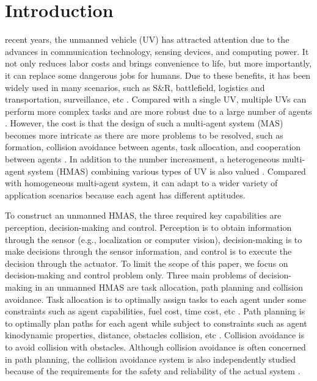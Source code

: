\documentclass{ieeeaccess}
\begin{document}
\section{Introduction}
 recent years, the unmanned vehicle (UV) has attracted attention due to the advances in communication technology, sensing devices, and computing power. It not only reduces labor costs and brings convenience to life, but more importantly, it can replace some dangerous jobs for humans. Due to these benefits, it has been widely used in many scenarios, such as S\&R, battlefield, logistics and transportation, surveillance, etc \cite{9700861}. Compared with a single UV, multiple UVs can perform more complex tasks and are more robust due to a large number of agents \cite{8352646}. However, the cost is that the design of such a multi-agent system (MAS) becomes more intricate as there are more problems to be resolved, such as formation, collision avoidance between agents, task allocation, and cooperation between agents \cite{chen2019control}. In addition to the number increasment, a heterogeneous multi-agent system (HMAS) combining various types of UV is also valued \cite{9371292}. Compared with homogeneous multi-agent system, it can adapt to a wider variety of application scenarios because each agent has different aptitudes.

To construct an unmanned HMAS, the three required key capabilities are perception, decision-making and control. Perception is to obtain information through the sensor (e.g., localization or computer vision), decision-making is to make decisions through the sensor information, and control is to execute the decision through the actuator. To limit the scope of this paper, we focus on decision-making and control problem only. Three main problems of decision-making in an unmanned HMAS are task allocation, path planning and collision avoidance. Task allocation is to optimally assign tasks to each agent under some constraints such as agent capabilities, fuel cost, time cost, etc \cite{skaltsis2021survey}. Path planning is to optimally plan paths for each agent while subject to constraints such as agent kinodynamic properties, distance, obstacles collision, etc \cite{zhang2018path}. Collision avoidance is to avoid collision with obstacles. Although collision avoidance is often concerned in path planning, the collision avoidance system is also independently studied because of the requirements for the safety and reliability of the actual system \cite{9108245}.
\end{document}
